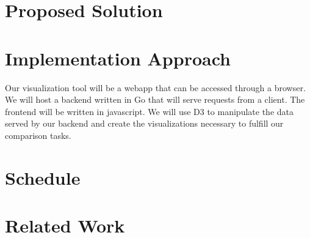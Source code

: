 \documentclass{article}
\begin{document}
\section{Proposed Solution}



\section{Implementation Approach}

Our visualization tool will be a webapp that can be accessed through a browser. We will host a backend written in Go that 
will serve requests from a client. The frontend will be written in javascript. We will use D3 to manipulate the data served
by our backend and create the visualizations necessary to fulfill our comparison tasks.

\section{Schedule}

\section{Related Work}
\end{document}
